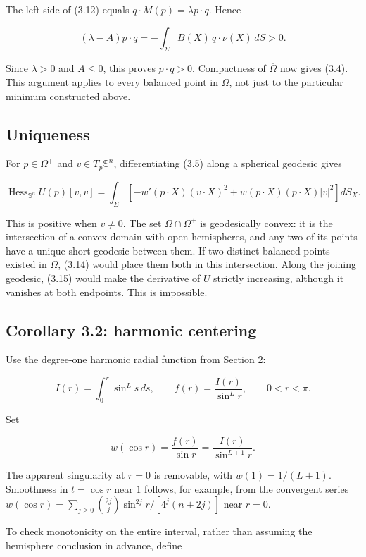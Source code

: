 \documentclass[11pt]{article}
\begin{document}
The left side of (3.12) equals \(q\cdot M(p)=\lambda p\cdot q\). Hence

\[
(\lambda-A)p\cdot q
=-\int_\Sigma B(X)\,q\cdot\nu(X)\,dS>0.
\tag{3.14}
\]

Since \(\lambda>0\) and \(A\leq0\), this proves \(p\cdot q>0\).
Compactness of \(\overline\Omega\) now gives (3.4). This argument
applies to every balanced point in \(\Omega\), not just to the
particular minimum constructed above.

\subsection{Uniqueness}\label{uniqueness}

For \(p\in\Omega^+\) and \(v\in T_p\mathbb S^n\), differentiating (3.5)
along a spherical geodesic gives

\[
\operatorname{Hess}_{\mathbb S^n}U(p)[v,v]
=\int_\Sigma
\left[-w'(p\cdot X)(v\cdot X)^2
+w(p\cdot X)(p\cdot X)|v|^2\right]dS_X.
\tag{3.15}
\]

This is positive when \(v\ne0\). The set \(\Omega\cap\Omega^+\) is
geodesically convex: it is the intersection of a convex domain with open
hemispheres, and any two of its points have a unique short geodesic
between them. If two distinct balanced points existed in \(\Omega\),
(3.14) would place them both in this intersection. Along the joining
geodesic, (3.15) would make the derivative of \(U\) strictly increasing,
although it vanishes at both endpoints. This is impossible.

\subsection{Corollary 3.2: harmonic
centering}\label{corollary-3.2-harmonic-centering}

Use the degree-one harmonic radial function from Section 2:

\[
I(r)=\int_0^r\sin^Ls\,ds,\qquad
f(r)=\frac{I(r)}{\sin^Lr},\qquad 0<r<\pi.
\tag{3.16}
\]

Set

\[
w(\cos r)=\frac{f(r)}{\sin r}
=\frac{I(r)}{\sin^{L+1}r}.
\tag{3.17}
\]

The apparent singularity at \(r=0\) is removable, with \(w(1)=1/(L+1)\).
Smoothness in \(t=\cos r\) near \(1\) follows, for example, from the
convergent series
\(w(\cos r)=\sum_{j\geq0}\binom{2j}{j}\sin^{2j}r/[4^j(n+2j)]\) near
\(r=0\).

To check monotonicity on the entire interval, rather than assuming the
hemisphere conclusion in advance, define
\end{document}
